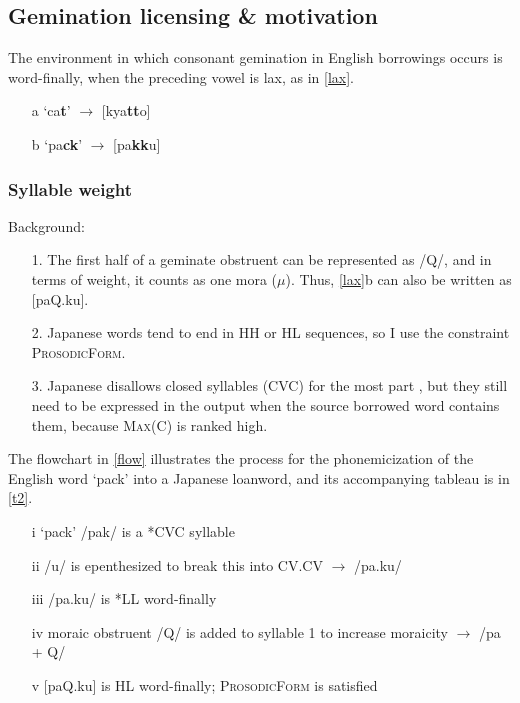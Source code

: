 \documentclass{article}
\begin{document}
\vspace{.25cm}

\subsection{Gemination licensing \& motivation}

The environment in which consonant gemination in English borrowings occurs is word-finally, when the preceding vowel is lax, as in \ref{lax}. \citep[p. 2]{Kawahara2015}

\begin{exe}
    \ex
    \begin{itemize}
        \item [a] ‘ca\textbf{t}' $\rightarrow$ [kya\textbf{tt}o]
        \item [b] ‘pa\textbf{ck}' $\rightarrow$ [pa\textbf{kk}u]
    \end{itemize}
    \label{lax}
    
\end{exe}

\subsubsection{Syllable weight}
Background:

\begin{itemize}
    \item [1.] The first half of a geminate obstruent can be represented as /Q/, and in terms of weight, it counts as one mora ($\mu$). Thus, \ref{lax}b can also be written as [paQ.ku].
    \item [2.] Japanese words tend to end in HH or HL sequences, so I use the constraint \textsc{ProsodicForm}. \citep[p. 4]{Kubozono2009}
    \item [3.] Japanese disallows closed syllables (CVC) for the most part \citep[p. 7]{Shinohara1996}, but they still need to be expressed in the output when the source borrowed word contains them, because \textsc{Max(C)} is ranked high.
\end{itemize}

 The flowchart in \ref{flow} illustrates the process for the phonemicization of the English word ‘pack' into a Japanese loanword, and its accompanying tableau is in \ref{t2}.

\begin{exe}
    \ex
    \label{flow}
    \begin{itemize}
        \item [i] ‘pack' /pak/ is a *CVC syllable
        \item [ii] /u/ is epenthesized to break this into CV.CV $\rightarrow$ /pa.ku/
        \item [iii] /pa.ku/ is *LL word-finally
        \item [iv] moraic obstruent /Q/ is added to syllable 1 to increase moraicity $\rightarrow$ /pa + Q/
        \item [v] [paQ.ku] is HL word-finally; \textsc{ProsodicForm} is satisfied
    \end{itemize}
\end{exe}
\end{document}
